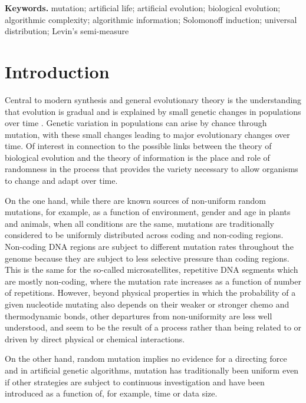 \documentclass[10pt]{article}
\begin{document}

\smallskip
\noindent \textbf{Keywords.} mutation; artificial life; artificial evolution; biological evolution; algorithmic complexity; algorithmic information; Solomonoff induction; universal distribution; Levin's semi-measure


\section{Introduction}\label{sec:introduction}


Central to modern synthesis and general evolutionary theory is the understanding that evolution is gradual and is explained by small genetic changes in populations over time \cite{hartl1997principles}. Genetic variation in populations can arise by chance through mutation, with these small changes leading to major evolutionary changes over time. Of interest in connection to the possible links between the theory of biological evolution and the theory of information is the place and role of randomness in the process that provides the variety necessary to allow organisms to change and adapt over time.

On the one hand, while there are known sources of non-uniform random mutations, for example, as a function of environment, gender and age in plants and animals, when all conditions are the same, mutations are traditionally considered to be uniformly distributed across coding and non-coding regions. Non-coding DNA regions are subject to different mutation rates throughout the genome because they are subject to less selective pressure than coding regions. This is the same for the so-called microsatellites, repetitive DNA segments which are mostly non-coding, where the mutation rate increases as a function of number of repetitions. However, beyond physical properties in which the probability of a given nucleotide mutating also depends on their weaker or stronger chemo and thermodynamic bonds, other departures from non-uniformity are less well understood, and seem to be the result of a process rather than being related to or driven by direct physical or chemical interactions.

On the other hand, random mutation implies no evidence for a directing force and in artificial genetic algorithms, mutation has traditionally been uniform even if other strategies are subject to continuous investigation and have been introduced as a function of, for example, time or data size.
\end{document}
